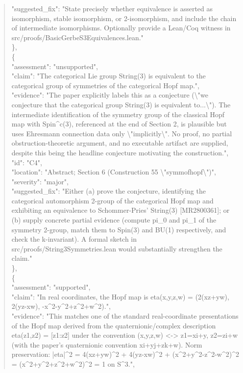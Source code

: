 \documentclass[11pt]{article}
\begin{document}
\begin{quote}
      "suggested\_fix": "State precisely whether equivalence is asserted as isomorphism, stable isomorphism, or 2-isomorphism, and include the chain of intermediate isomorphisms. Optionally provide a Lean/Coq witness in src/proofs/BasicGerbeS3Equivalences.lean."\\
    \},\\
    \{\\
      "assessment": "unsupported",\\
      "claim": "The categorical Lie group String(3) is equivalent to the categorical group of symmetries of the categorical Hopf map.",\\
      "evidence": "The paper explicitly labels this as a conjecture (\textbackslash{}"we conjecture that the categorical group String(3) is equivalent to...\textbackslash{}"). The intermediate identification of the symmetry group of the classical Hopf map with Spin\^{}c(3), referenced at the end of Section 2, is plausible but uses Ehresmann connection data only \textbackslash{}"implicitly\textbackslash{}". No proof, no partial obstruction-theoretic argument, and no executable artifact are supplied, despite this being the headline conjecture motivating the construction.",\\
      "id": "C4",\\
      "location": "Abstract; Section 6 (Construction 55 \textbackslash{}"symmofhopf\textbackslash{}")",\\
      "severity": "major",\\
      "suggested\_fix": "Either (a) prove the conjecture, identifying the categorical automorphism 2-group of the categorical Hopf map and exhibiting an equivalence to Schommer-Pries' String(3) [MR2800361]; or (b) supply concrete partial evidence (compute pi\_0 and pi\_1 of the symmetry 2-group, match them to Spin(3) and BU(1) respectively, and check the k-invariant). A formal sketch in src/proofs/String3Symmetries.lean would substantially strengthen the claim."\\
    \},\\
    \{\\
      "assessment": "supported",\\
      "claim": "In real coordinates, the Hopf map is eta(x,y,z,w) = (2(xz+yw), 2(yz-xw), -x\^{}2-y\^{}2+z\^{}2+w\^{}2).",\\
      "evidence": "This matches one of the standard real-coordinate presentations of the Hopf map derived from the quaternionic/complex description eta(z1,z2) = [z1:z2] under the convention (x,y,z,w) <-> z1=xi+y, z2=zi+w (with the paper's quaternionic convention xi+yj+zk+w). Norm preservation: |eta|\^{}2 = 4(xz+yw)\^{}2 + 4(yz-xw)\^{}2 + (x\^{}2+y\^{}2-z\^{}2-w\^{}2)\^{}2 = (x\^{}2+y\^{}2+z\^{}2+w\^{}2)\^{}2 = 1 on S\^{}3.",\\

\end{quote}
\end{document}

